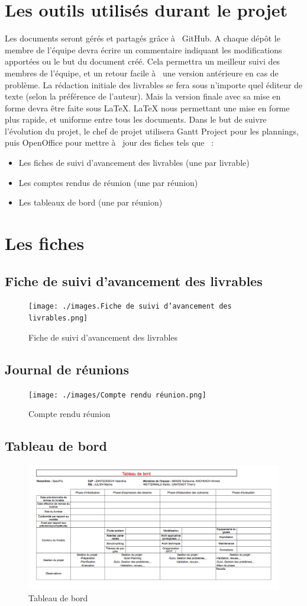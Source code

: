 \section{Les outils utilisés durant le projet}
    Les documents seront gérés et partagés grâce à  GitHub. A chaque dépôt le membre de l'équipe devra écrire un commentaire indiquant les modifications apportées ou le but du document créé. Cela permettra un meilleur suivi des membres de l'équipe, et un retour facile à  une version antérieure en cas de problème.
    La rédaction initiale des livrables se fera sous n'importe quel éditeur de texte (selon la préférence de l'auteur). Mais la version finale avec sa mise en forme devra être faite sous LaTeX. LaTeX nous permettant une mise en forme plus rapide, et uniforme entre tous les documents.
Dans le but de suivre l'évolution du projet, le chef de projet utilisera Gantt Project pour les plannings, puis OpenOffice pour mettre à  jour des fiches tels que  :
\begin{itemize}
    \item Les fiches de suivi d'avancement des livrables (une par livrable)
    \item Les comptes rendus de réunion (une par réunion)
    \item Les tableaux de bord (une par réunion)
\end{itemize}

\section{Les fiches}
\subsection{Fiche de suivi d'avancement des livrables}
\begin{figure}[h]
    \centering
    \texttt{[image: ./images.Fiche de suivi d'avancement des livrables.png]}
    \caption{Fiche de suivi d'avancement des livrables}
\end{figure}
\subsection{Journal de réunions}
\begin{figure}[h]
    \centering
    \texttt{[image: ./images/Compte rendu réunion.png]}
    \caption{Compte rendu réunion}
\end{figure}
\subsection{Tableau de bord}
\begin{figure}[h]
    \centering
    \includegraphics[width=140mm]{./images/Tableau de bord.png}
    \caption{Tableau de bord}
\end{figure}
